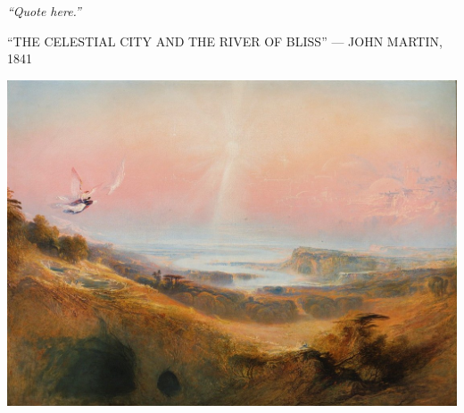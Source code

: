 \clearpage
\thispagestyle{empty}
\null\vfill
\settowidth{}
\begin{center}
\parbox{\longest}{%
  \raggedright{\huge\itshape%
    ``Quote here.'' \par\bigskip
  }
  \raggedleft\Large\MakeUppercase{``The Celestial City and the River of Bliss'' — John Martin, 1841}\par%
}
\vfill\vfill
\clearpage\newpage
\end{center}
\newpage
\thispagestyle{empty}
\begin{center}
	\includegraphics[angle=90, width=1\textwidth]{images/illustrations/johnmartinnewjerusalem}
\end{center}